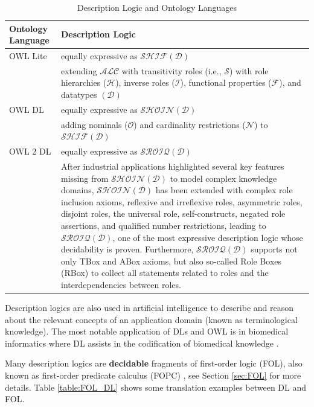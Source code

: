 \begin{longtable}[h]{ p{20mm} p{110mm} }
\caption{Description Logic and Ontology Languages}
\label{table:DL_ontology_language}\\
\hline
Ontology Language & Description Logic\\
\hline
OWL Lite & equally expressive as $\mathcal{SHIF(D)}$\\
& extending $\mathcal{ALC}$ with transitivity roles (i.e., $\mathcal{S}$) with role hierarchies ($\mathcal{H}$), inverse roles ($\mathcal{I}$), functional properties ($\mathcal{F}$), and datatypes $\mathcal{(D)}$\\
\hline
OWL DL & equally expressive as $\mathcal{SHOIN(D)}$\\
& adding nominals ($\mathcal{O}$) and cardinality restrictions ($\mathcal{N}$) to $\mathcal{SHIF(D)}$\\
\hline
OWL 2 DL & equally expressive as $\mathcal{SROIQ(D)}$\\
& After industrial applications highlighted several key features missing from $\mathcal{SHOIN(D)}$ to model complex knowledge domains, $\mathcal{SHOIN(D)}$ has been extended with complex role inclusion axioms, reflexive and irreflexive roles, asymmetric roles, disjoint roles, the universal role, self-constructs, negated role assertions, and qualified number restrictions, leading to $\mathcal{SROIQ(D)}$, one of the most expressive description logic whose decidability is proven. Furthermore, $\mathcal{SROIQ(D)}$ supports not only TBox and ABox axioms, but also so-called Role Boxes (RBox) to collect all statements related to roles and the interdependencies between roles.\\
\hline
\end{longtable}

Description logics are also used in artificial intelligence to describe and reason about the relevant concepts of an application domain (known as terminological knowledge). The most notable application of DLs and OWL is in biomedical informatics where DL assists in the codification of biomedical knowledge \cite{Description_logic}.

Many description logics are \textbf{decidable} fragments of first-order logic (FOL), also known as first-order predicate calculus (FOPC) \cite{DL_FOL}, see Section \ref{sec:FOL} for more details. 
Table \ref{table:FOL_DL} shows some translation examples between DL and FOL.


